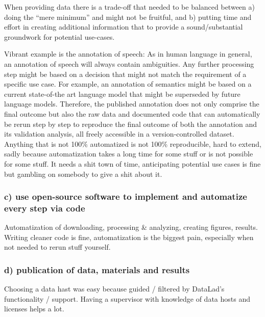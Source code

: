 When providing data there is a trade-off that needed to be balanced between a)
doing the ``mere minimum'' and  might not be fruitful, and b) putting time and
effort in creating additional information that to provide a sound/substantial
groundwork for potential use-cases.

%
Vibrant example is the annotation of speech:
%
As in human language in general, an annotation of speech will always contain
ambiguities.
%
Any further processing step might be based on a decision that might not match
the requirement of a specific use case.
%
For example, an annotation of semantics might be based on a current state-of-the
art language model that might be superseded by future language models.
%
Therefore, the published annotation does not only comprise the final outcome but
also the raw data and documented code that can automatically be rerun step by
step to reproduce the final outcome of both the annotation and its validation
analysis, all freely accessible in a version-controlled dataset.
%
Anything that is not 100\% automatized is not 100\% reproducible, hard to
extend, sadly because automatization takes a long time for some stuff or is not
possible for some stuff.
%
It needs a shit town of time, anticipating potential use cases is fine but
gambling on somebody to give a shit about it.



\subsubsection{c) use open-source software to implement and automatize every
step via code}

%
Automatization of downloading, processing \& analyzing, creating figures,
results.
%
Writing cleaner code is fine, automatization is the biggest pain, especially
when not needed to rerun stuff yourself.


\subsubsection{d) publication of data, materials and results}




%
Choosing a data hast was easy because guided / filtered by DataLad's
functionality / support.
%
Having a supervisor with knowledge of data hosts and licenses helps a lot.



